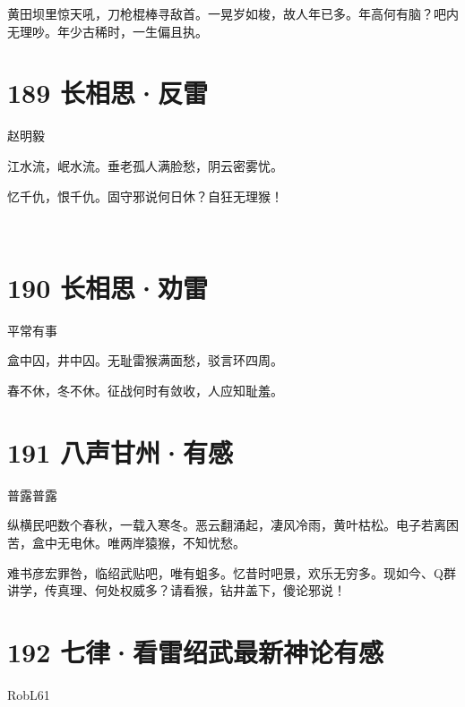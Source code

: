 \documentclass[UTF8,12pt,oneside]{ctexbook}
\begin{document}
        黄田坝里惊天吼，刀枪棍棒寻敌首。一晃岁如梭，故人年已多。年高何有脑？吧内无理吵。年少古稀时，一生偏且执。
        ~\\
        
        \section{189 长相思·反雷}
        \begin{center}
            赵明毅
        \end{center}
        
        \begin{center}
        江水流，岷水流。垂老孤人满脸愁，阴云密雾忧。
        
        忆千仇，恨千仇。固守邪说何日休？自狂无理猴！
        
        ~\\
        \end{center}

        \section{190 长相思·劝雷}
        \begin{center}
            平常有事
        \end{center}

        \begin{center}
        盒中囚，井中囚。无耻雷猴满面愁，驳言环四周。
        
        春不休，冬不休。征战何时有敛收，人应知耻羞。
        \end{center}

        \newpage

        \section{191 八声甘州·有感}
        \begin{center}
            普露普露
        \end{center}
        
         纵横民吧数个春秋，一载入寒冬。恶云翻涌起，凄风冷雨，黄叶枯松。电子若离困苦，盒中无电休。唯两岸猿猴，不知忧愁。

         难书彦宏罪咎，临绍武贴吧，唯有蛆多。忆昔时吧景，欢乐无穷多。现如今、Q群讲学，传真理、何处权威多？请看猴，钻井盖下，傻论邪说！
         ~\\

        \section{192 七律·看雷绍武最新神论有感}
        \begin{center}
            RobL61
        \end{center}
        
\end{document}
